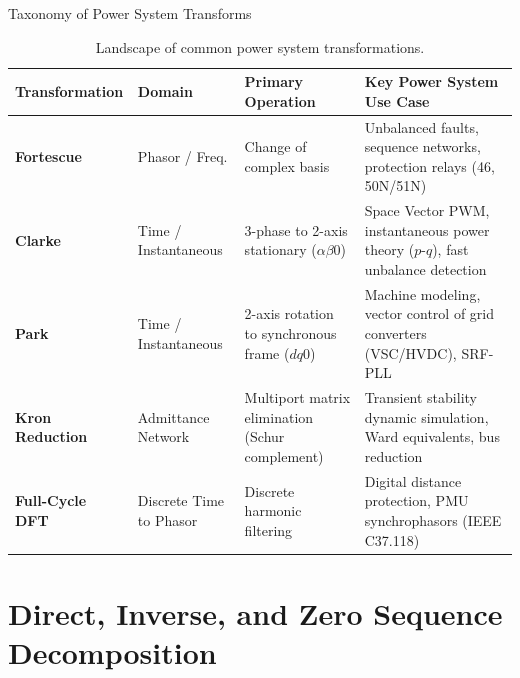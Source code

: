 \begin{frame}[shrink=10]{Taxonomy of Power System Transforms}
    \begin{table}
        \centering
        \scriptsize
        \begin{tabularx}{\textwidth}{l p{2.2cm} p{2.5cm} X}
            \toprule
            \textbf{Transformation} & \textbf{Domain} & \textbf{Primary Operation} & \textbf{Key Power System Use Case} \\
            \midrule
            \textbf{Fortescue} & Phasor / Freq. & Change of complex basis & Unbalanced faults, sequence networks, protection relays (46, 50N/51N) \\
            \addlinespace
            \textbf{Clarke} & Time / Instantaneous & 3-phase to 2-axis stationary ($\alpha\beta0$) & Space Vector PWM, instantaneous power theory ($p\text{-}q$), fast unbalance detection \\
            \addlinespace
            \textbf{Park} & Time / Instantaneous & 2-axis rotation to synchronous frame ($dq0$) & Machine modeling, vector control of grid converters (VSC/HVDC), SRF-PLL \\
            \addlinespace
            \textbf{Kron Reduction} & Admittance Network & Multiport matrix elimination (Schur complement) & Transient stability dynamic simulation, Ward equivalents, bus reduction \\
            \addlinespace
            \textbf{Full-Cycle DFT} & Discrete Time to Phasor & Discrete harmonic filtering & Digital distance protection, PMU synchrophasors (IEEE C37.118) \\
            \bottomrule
        \end{tabularx}
        \caption{Landscape of common power system transformations.}
    \end{table}
\end{frame}


\section{Direct, Inverse, and Zero Sequence Decomposition}

